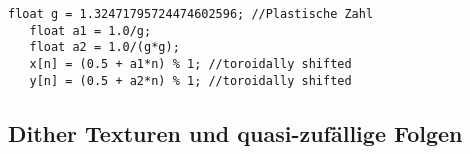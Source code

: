 \cite{quasirandomsequencesbyRoberts}
\begin{lstlisting}[style=CStyle]
   float g = 1.32471795724474602596; //Plastische Zahl
   float a1 = 1.0/g;
   float a2 = 1.0/(g*g);
   x[n] = (0.5 + a1*n) % 1; //toroidally shifted
   y[n] = (0.5 + a2*n) % 1; //toroidally shifted
\end{lstlisting}


\subsection{Dither Texturen und quasi-zufällige Folgen}
